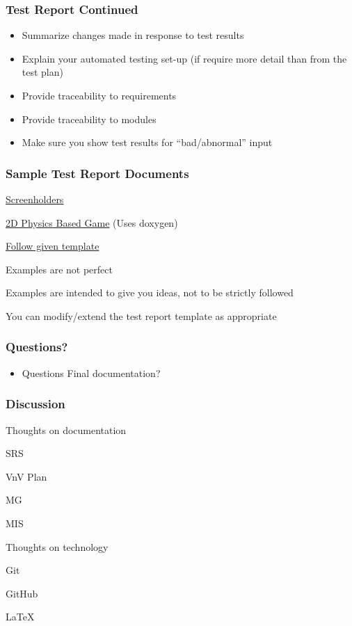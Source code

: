 \documentclass[t,12pt,numbers,fleqn]{beamer}
\begin{document}

\begin{frame}
\frametitle{Test Report Continued}
\begin{itemize}
\item Summarize changes made in response to test results
\item Explain your automated testing set-up (if require more detail than from
  the test plan)
\item Provide traceability to requirements
\item Provide traceability to modules
\item Make sure you show test results for ``bad/abnormal'' input
\end{itemize}
\end{frame}


\begin{frame}
\frametitle{Sample Test Report Documents} 

\bi
\item
  \href{https://gitlab.cas.mcmaster.ca/screenholders/screenholders}{Screenholders}
\item
  \href{https://github.com/palmerst/CS-4ZP6/tree/master}{2D Physics Based Game}
  (Uses doxygen)
\item
  \href{https://gitlab.cas.mcmaster.ca/smiths/cas741/tree/master/BlankProjectTemplate/Doc/TestReport}{Follow given template}
\item Examples are not perfect
\item Examples are intended to give you ideas, not to be strictly followed
\item You can modify/extend the test report template as appropriate
\ei

\end{frame}


\begin{frame}
\frametitle{Questions?}
\begin{itemize}
\item Questions Final documentation?
\end{itemize}
\end{frame}


\begin{frame}
\frametitle{Discussion}

\bi
\item Thoughts on documentation
\bi
\item SRS
\item VnV Plan
\item MG
\item MIS
\ei
\item Thoughts on technology
\bi
\item Git
\item GitHub
\item LaTeX
\ei
\ei

\end{frame}
\end{document}
